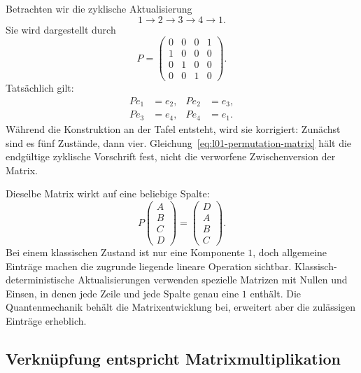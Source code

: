 Betrachten wir die zyklische Aktualisierung
\begin{equation}
  1\longrightarrow2\longrightarrow3\longrightarrow4\longrightarrow1.
  \label{eq:l01-four-cycle}
\end{equation}
Sie wird dargestellt durch
\begin{equation}
  P=
  \begin{pmatrix}
    0&0&0&1\\
    1&0&0&0\\
    0&1&0&0\\
    0&0&1&0
  \end{pmatrix}.
  \label{eq:l01-permutation-matrix}
\end{equation}
Tatsächlich gilt:
\begin{equation}
  \begin{aligned}
    Pe_1&=e_2, & Pe_2&=e_3,\\
    Pe_3&=e_4, & Pe_4&=e_1.
  \end{aligned}
\end{equation}
Während die Konstruktion an der Tafel entsteht, wird sie korrigiert: Zunächst sind es fünf Zustände, dann vier. Gleichung~\eqref{eq:l01-permutation-matrix} hält die endgültige zyklische Vorschrift fest, nicht die verworfene Zwischenversion der Matrix.

Dieselbe Matrix wirkt auf eine beliebige Spalte:
\begin{equation}
  P
  \begin{pmatrix}A\\B\\C\\D\end{pmatrix}
  =
  \begin{pmatrix}D\\A\\B\\C\end{pmatrix}.
  \label{eq:l01-cyclic-shift}
\end{equation}
Bei einem klassischen Zustand ist nur eine Komponente \(1\), doch allgemeine Einträge machen die zugrunde liegende lineare Operation sichtbar. Klassisch-deterministische Aktualisierungen verwenden spezielle Matrizen mit Nullen und Einsen, in denen jede Zeile und jede Spalte genau eine \(1\) enthält. Die Quantenmechanik behält die Matrixentwicklung bei, erweitert aber die zulässigen Einträge erheblich.

\subsection{Verknüpfung entspricht Matrixmultiplikation}

